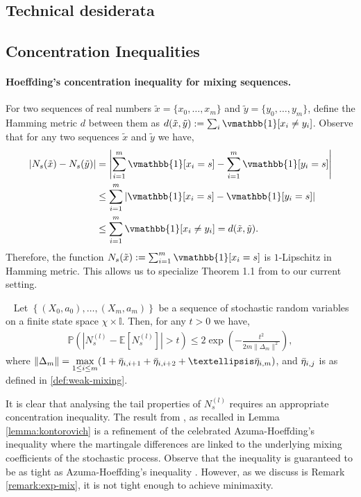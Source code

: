 \documentclass[opre,sglanonrev]{informs4}
\numberwithin{equation}{section}
\newcommand{\pow}[1]{^{(#1)}}
\newcommand{\datas}{\{x_0,\dots,x_m\}}
\newcommand{\datay}{\{y_0,\dots,y_m\}}
\newcommand{\Ibb}{\mathbb{I}}
\newcommand{\Pbb}{\mathbb{P}}
\newcommand{\indexeddata}{\left\{(X_0,a_0),\dots,(X_m,a_m)\right\}}
\newcommand{\prob}{\Pbb}
\newcommand{\expec}{\mathbb{E}}
\newcommand{\indicator}{\vmathbb{1}}
\begin{document}
\begin{APPENDICES}
\section{Technical desiderata}\label{sec:tech-des}

\subsection{Concentration Inequalities}\label{sec:concentration-ineq}
\paragraph{Hoeffding's concentration inequality for mixing sequences.} 
For two sequences of real numbers $\tilde{x}=\datas$ and $\tilde{y}=\datay$, define the {Hamming metric} $d$ between them as $d(\tilde{x},\tilde{y}) := \sum_i \indicator[x_i\neq y_i]$. 
{Observe that for any two sequences $\tilde{x}$ and $\tilde{y}$ we have, %
\begin{align*}
    |N_s(\tilde{x})-N_s(\tilde{y})| & = \left|\sum_{i=1}^m \indicator[x_i=s]-\sum_{i=1}^m \indicator[y_i=s] \right|\\
    & \leq \sum_{i=1}^m \left| \indicator[x_i=s]-\indicator[y_i=s] \right|\\
    & \leq \sum_{i=1}^m \indicator[x_i\neq y_i]= d(\tilde{x},\tilde{y}).
\end{align*}
Therefore, the function  $N_s(\tilde{x}):=\sum_{i=1}^m \indicator[x_i=s]$ is $1$-Lipschitz in Hamming metric.
This allows us to specialize Theorem 1.1 from \cite{kontorovich2008concentration} to our current setting.}
\begin{lemma}~\label{lemma:kontorovich}
    Let $\indexeddata$ be a sequence of stochastic random variables on a finite state space $\chi\times\Ibb$. 
    Then, for any $t > 0$ we have,
  \begin{align}
      \prob(|N_s\pow{l}-\expec[N_s\pow{l}]|>t)\leq 2\exp\left(-\frac{t^2}{2m\|\Delta_m\|^2}\right),
  \end{align}
where $\|\Delta_m\|=\underset{1\leq i\leq m}{\max} (1+ \Bar{\eta}_{i,i+1}+ \Bar{\eta}_{i,i+2}+\dots \Bar{\eta}_{i,m})$, and $\Bar{\eta}_{i,j}$ is as defined in \cref{def:weak-mixing}.
\end{lemma}
\begin{remark}
It is clear that analysing the tail properties of $N_s\pow{l}$ requires an appropriate concentration inequality.
The result from \citet{kontorovich2008concentration}, as recalled in Lemma \ref{lemma:kontorovich} is a refinement of the celebrated Azuma-Hoeffding's inequality \citep{azuma1967weighted} where the martingale differences are linked to the underlying mixing coefficients of the stochastic process. Observe that the inequality is guaranteed to be as tight as Azuma-Hoeffding's inequality \cite[Theorem 7.5]{kontorovich2008concentration}. However, as we discuss is Remark \ref{remark:exp-mix}, it is not tight enough to achieve minimaxity.
\end{remark}


\end{APPENDICES}
\end{document}
